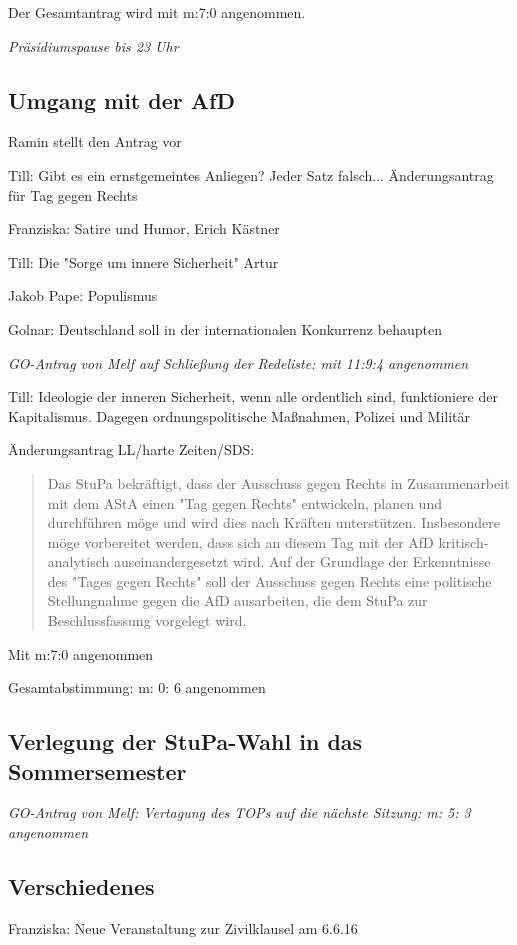 \documentclass[ngerman,headheight=70pt]{scrartcl}
\begin{document}
    Der Gesamtantrag wird mit m:7:0 angenommen.

    \textit{Präsidiumspause bis 23 Uhr}

    \subsection{Umgang mit der AfD}

    Ramin stellt den Antrag vor

    Till: Gibt es ein ernstgemeintes Anliegen? Jeder Satz falsch... Änderungsantrag für Tag gegen Rechts

    Franziska: Satire und Humor, Erich Kästner

    Till: Die "Sorge um innere Sicherheit"
    Artur

    Jakob Pape: Populismus

    Golnar: Deutschland soll in der internationalen Konkurrenz behaupten

    \textit{GO-Antrag von Melf auf Schließung der Redeliste: mit 11:9:4 angenommen}

    Till: Ideologie der inneren Sicherheit, wenn alle ordentlich sind, funktioniere
    der Kapitalismus. Dagegen ordnungspolitische Maßnahmen, Polizei und Militär

    Änderungsantrag LL/harte Zeiten/SDS:
    \blockquote{Das StuPa bekräftigt, dass der
    Ausschuss gegen Rechts in Zusammenarbeit mit dem AStA einen "Tag gegen Rechts"
    entwickeln, planen und durchführen möge und wird dies nach Kräften unterstützen.
    Insbesondere möge vorbereitet werden, dass sich an diesem Tag mit der AfD
    kritisch-analytisch auseinandergesetzt wird. Auf der Grundlage der Erkenntnisse
    des "Tages gegen Rechts" soll der Ausschuss gegen Rechts eine politische
    Stellungnahme gegen die AfD ausarbeiten, die dem StuPa zur Beschlussfassung
    vorgelegt wird.}

    Mit m:7:0 angenommen

    Gesamtabstimmung: m: 0: 6 angenommen

    \subsection{Verlegung der StuPa-Wahl in das Sommersemester}

    \textit{GO-Antrag von Melf: Vertagung des TOPs auf die nächste Sitzung: m: 5: 3 angenommen}

    \subsection{Verschiedenes}

    Franziska: Neue Veranstaltung zur Zivilklausel am 6.6.16
\end{document}
